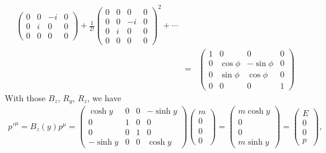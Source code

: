 \documentclass[11pt]{article}
\begin{document}
\begin{itemize}
\begin{eqnarray}
\begin{pmatrix}
            0 & 0 & -i & 0 \\
            0 & i & 0 & 0 \\
            0 & 0 & 0 & 0 
        \end{pmatrix}
        +\frac{1}{2!}
        \begin{pmatrix}
            0 & 0 & 0 & 0 \\
            0 & 0 & -i & 0 \\
            0 & i & 0 & 0 \\
            0 & 0 & 0 & 0 
        \end{pmatrix}^2
        +\cdots \\
        &=&
        \begin{pmatrix}
            1 & 0 & 0 & 0 \\
            0 & \cos\phi & -\sin\phi & 0 \\
            0 & \sin\phi & \cos\phi & 0 \\
            0 & 0 & 0 & 1
        \end{pmatrix}
    \end{eqnarray}
    With those $B_z$, $R_y$, $R_z$, we have
    \begin{eqnarray}
        {p'}^\mu = B_z(y) p^\mu =
        \begin{pmatrix}
            \cosh y & 0 & 0 & -\sinh y \\
            0 & 1 & 0 & 0 \\
            0 & 0 & 1 & 0 \\
            -\sinh y & 0 & 0 & \cosh y
        \end{pmatrix}
        \begin{pmatrix}
            m \\ 0 \\ 0 \\ 0
          \end{pmatrix}
        =
        \begin{pmatrix}
          m \cosh y \\ 0 \\ 0 \\ m \sinh y 
        \end{pmatrix}
        =
        \begin{pmatrix}
         E \\ 0 \\ 0 \\ p
        \end{pmatrix},
      \end{eqnarray}
    

\end{itemize}
\end{document}
